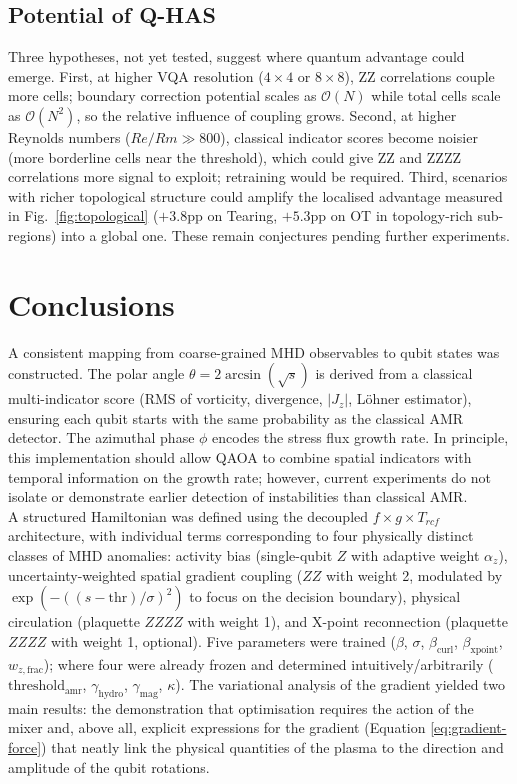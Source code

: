 \documentclass[12pt, a4paper, oneside]{report}
\begin{document}
\section{Potential of Q-HAS}

Three hypotheses, not yet tested, suggest where quantum advantage could emerge.  First, at higher VQA resolution ($4\times 4$ or $8\times 8$), ZZ correlations couple more cells; boundary correction potential scales as $\mathcal{O}(N)$ while total cells scale as $\mathcal{O}(N^2)$, so the relative influence of coupling grows.  Second, at higher Reynolds numbers ($Re/Rm \gg 800$), classical indicator scores become noisier (more borderline cells near the threshold), which could give ZZ and ZZZZ correlations more signal to exploit; retraining would be required.  Third, scenarios with richer topological structure could amplify the localised advantage measured in Fig.~\ref{fig:topological} ($+3.8$pp on Tearing, $+5.3$pp on OT in topology-rich sub-regions) into a global one.  These remain conjectures pending further experiments.

\chapter{Conclusions}
\label{chap:conclusions}


A consistent mapping from coarse-grained MHD observables to qubit states was constructed. The polar angle $\theta = 2 \arcsin(\sqrt{s})$ is derived from a classical multi-indicator score (RMS of vorticity, divergence, $|J_z|$, L\"ohner estimator), ensuring each qubit starts with the same probability as the classical AMR detector. The azimuthal phase $\phi$ encodes the stress flux growth rate. In principle, this implementation should allow QAOA to combine spatial indicators with temporal information on the growth rate; however, current experiments do not isolate or demonstrate earlier detection of instabilities than classical AMR.\\

A structured Hamiltonian was defined using the decoupled $f \times g \times T_{rcf}$ architecture, with individual terms corresponding to four physically distinct classes of MHD anomalies: activity bias (single-qubit $Z$ with adaptive weight $\alpha_z$), uncertainty-weighted spatial gradient coupling ($ZZ$ with weight 2, modulated by $\exp(-((s - \text{thr})/\sigma)^2)$ to focus on the decision boundary), physical circulation (plaquette $ZZZZ$ with weight 1), and X-point reconnection (plaquette $ZZZZ$ with weight 1, optional). Five parameters were trained ($\beta$, $\sigma$, $\beta_{\text{curl}}$, $\beta_{\text{xpoint}}$, $w_{z,\text{frac}}$); where four were already frozen and determined intuitively/arbitrarily ($\text{threshold}_{\text{amr}}$, $\gamma_{\text{hydro}}$, $\gamma_{\text{mag}}$, $\kappa$). The variational analysis of the gradient yielded two main results: the demonstration that optimisation requires the action of the mixer and, above all, explicit expressions for the gradient (Equation \ref{eq:gradient-force}) that neatly link the physical quantities of the plasma to the direction and amplitude of the qubit rotations.\\
\end{document}
